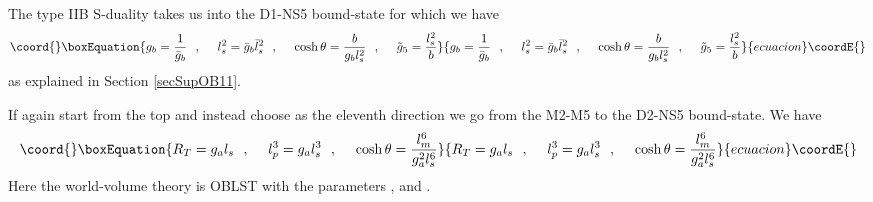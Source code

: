 \documentclass[a4paper,twoside,titlepage,12pt]{article}
\begin{document}
The type IIB S-duality takes us into the D1-NS5 bound-state
for which we have
%
\begin{equation}\coord{}\boxEquation{
\label{D1NS5results}
\gsnb = \frac{1}{\gsbb} \spa
\lsn^2 = \gsbb \lsb^2 \spa
\cosh \theta = \frac{b}{\gsnb \lsn^2} \spa
\tilde{g}_5 = \frac{\lsn^2}{b}
}{
\gsnb = \frac{1}{\gsbb} \spa
\lsn^2 = \gsbb \lsb^2 \spa
\cosh \theta = \frac{b}{\gsnb \lsn^2} \spa
\tilde{g}_5 = \frac{\lsn^2}{b}
}{ecuacion}\coordE{}\end{equation}
%
as explained in Section \ref{secSupOB11}.

If again start from the top and instead choose \coordHE{} as the eleventh direction 
we go from the M2-M5 to the D2-NS5 bound-state. We have
%
\begin{equation}\coord{}\boxEquation{
R_T = \gsna \lsn \spa
l_p^3 = \gsna \lsn^3 \spa
\cosh \theta = \frac{\lm^6}{\gsna^2 \lsn^6}
}{
R_T = \gsna \lsn \spa
l_p^3 = \gsna \lsn^3 \spa
\cosh \theta = \frac{\lm^6}{\gsna^2 \lsn^6}
}{ecuacion}\coordE{}\end{equation}
%
Here the world-volume theory is \coordHE{} OBLST with the parameters
\myHighlight{$\lsn$}\coordHE{}, \myHighlight{$\lm$}\coordHE{} and \coordHE{}.
\end{document}

